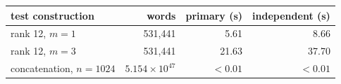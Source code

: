 \begin{center}\begin{minipage}{\linewidth}\centering\small
\begin{tabular}{@{}lrrr@{}}
\toprule
test construction & words & primary (s) & independent (s) \\
\midrule
rank 12, $m=1$ & 531,441 & 5.61 & 8.66 \\
rank 12, $m=3$ & 531,441 & 21.63 & 37.70 \\
concatenation, $n=1024$ & $5.154\times10^{47}$ & $<0.01$ & $<0.01$ \\
\bottomrule
\end{tabular}
\label{tab:trifference_verifier}
\end{minipage}\end{center}
